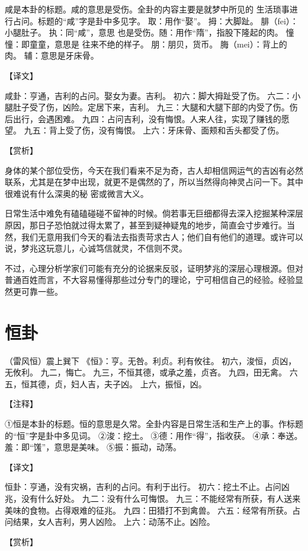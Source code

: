\documentclass[a4paper,12pt,UTF8,twoside]{ctexbook}
\begin{document}
咸是本卦的标题。咸的意思是受伤。全卦的内容主要是就梦中所见的 生活琐事进行占问。标题的“咸”字是卦中多见字。
取：用作“娶”。
拇：大脚趾。
腓（fei）：小腿肚子。
执：同“咸”，意思 也是受伤。随：用作“隋”，指股下隆起的肉。
憧憧：即童童，意思是 往来不绝的样子。
朋：朋贝，货币。
脢（mei）：背上的肉。
辅：意思是牙床骨。

【译文】

咸卦：亨通，吉利的占问。娶女为妻。吉利。
初六：脚大拇趾受了伤。
六二：小腿肚子受了伤，凶险。定居下来，吉利。
九三：大腿和大腿下部的内受了伤。伤后出行，会遇困难。
九四：占问吉利，没有悔恨。人来人往，实现了赚钱的愿望。
九五：背上受了伤，没有悔恨。
上六：牙床骨、面颊和舌头都受了伤。

【赏析】

身体的某个部位受伤，今天在我们看来不足为奇，古人却相信网运气的吉凶有必然联系，尤其是在梦中出现，就更不是偶然的了，所以当然得向神灵占问一下。其中很难说有什么深奥的秘 密或微言大义。

日常生活中难免有磕磕碰碰不留神的时候。倘若事无巨细都得去深入挖掘某种深层原因，那日子恐怕就过得太累了，甚至到疑神疑鬼的地步，简直会寸步难行。当然，我们无意用我们今天的看法去指责苛求古人；他们自有他们的道理。或许可以说，梦兆这玩意儿，心诚笃信就灵，不信则不灵。

不过，心理分析学家们可能有充分的论据来反驳，证明梦兆的深层心理根源。但对普通百姓而言，不大容易懂得那些过分专门的理论，宁可相信自己的经验。经验显然更可靠一些。

\chapter{恒卦}

（雷风恒）震上巽下
《恒》：亨。无咎。利贞。利有攸往。
初六，浚恒，贞凶，无攸利。
九二，悔亡。
九三，不恒其德，或承之羞，贞吝。
九四，田无禽。
六五，恒其德，贞，妇人吉，夫子凶。
上六，振恒，凶。

【注释】

①恒是本卦的标题。恒的意思是久常。全卦内容是日常生活和生产上的事。作标题的“恒”字是卦中多见词。
②浚：挖土。
③德：用作“得”，指收获。
④承：奉送。羞：即“馐”，意思是美味。
⑤振：振动，动荡。

【译文】

恒卦：亨通，没有灾祸，吉利的占问。有利于出行。
初六：挖土不止。占问凶兆，没有什么好处。
九二：没有什么可悔恨。
九三：不能经常有所获，有人送来美味的食物。占得艰难的征兆。
九四：田猎打不到禽兽。
六五：经常有所获。占问结果，女人吉利，男人凶险。
上六：动荡不止。凶险。

【赏析】
\end{document}
